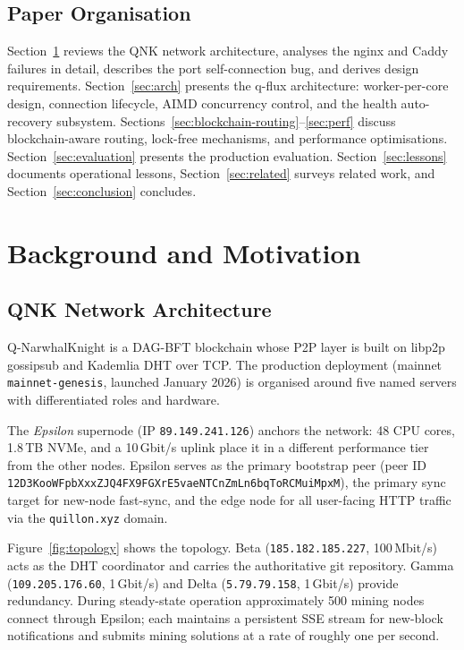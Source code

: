 \documentclass[a4paper, 11pt]{article}
\begin{document}
\subsection*{Paper Organisation}

Section~\ref{sec:background} reviews the QNK network architecture, analyses the
nginx and Caddy failures in detail, describes the port self-connection bug, and
derives design requirements.  Section~\ref{sec:arch} presents the q-flux
architecture: worker-per-core design, connection lifecycle, AIMD concurrency
control, and the health auto-recovery subsystem.  Sections~\ref{sec:blockchain-routing}--\ref{sec:perf}
discuss blockchain-aware routing, lock-free mechanisms, and performance optimisations.
Section~\ref{sec:evaluation} presents the production evaluation.
Section~\ref{sec:lessons} documents operational lessons,
Section~\ref{sec:related} surveys related work, and Section~\ref{sec:conclusion}
concludes.

\section{Background and Motivation}
\label{sec:background}

\subsection{QNK Network Architecture}

Q-NarwhalKnight is a DAG-BFT blockchain whose P2P layer is built on libp2p
gossipsub and Kademlia DHT over TCP.  The production deployment (mainnet
\texttt{mainnet-genesis}, launched January 2026) is organised around five
named servers with differentiated roles and hardware.

The \emph{Epsilon} supernode (IP \texttt{89.149.241.126}) anchors the network:
48 CPU cores, 1.8\,TB NVMe, and a 10\,Gbit/s uplink place it in a different
performance tier from the other nodes.  Epsilon serves as the primary bootstrap
peer (peer ID
\texttt{12D3KooWFpbXxxZJQ4FX9FGXrE5vaeNTCnZmLn6bqToRCMuiMpxM}),
the primary sync target for new-node fast-sync, and the edge node for all
user-facing HTTP traffic via the \texttt{quillon.xyz} domain.

Figure~\ref{fig:topology} shows the topology.  Beta
(\texttt{185.182.185.227}, 100\,Mbit/s) acts as the DHT coordinator and
carries the authoritative git repository.  Gamma (\texttt{109.205.176.60},
1\,Gbit/s) and Delta (\texttt{5.79.79.158}, 1\,Gbit/s) provide redundancy.
During steady-state operation approximately 500 mining nodes connect through
Epsilon; each maintains a persistent SSE stream for new-block notifications
and submits mining solutions at a rate of roughly one per second.
\end{document}
